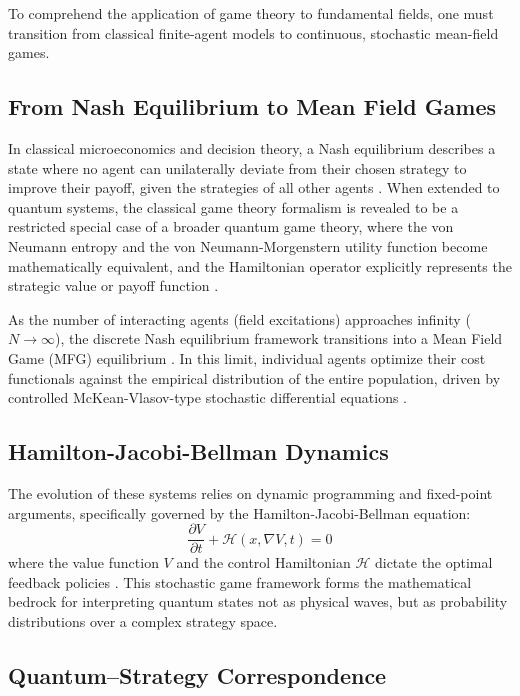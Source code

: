 \documentclass[12pt,a4paper]{article}
\theoremstyle{remark}
\begin{document}
To comprehend the application of game theory to fundamental fields, one must transition from classical finite-agent models to continuous, stochastic mean-field games.

\subsection{From Nash Equilibrium to Mean Field Games}

In classical microeconomics and decision theory, a Nash equilibrium describes a state where no agent can unilaterally deviate from their chosen strategy to improve their payoff, given the strategies of all other agents \citep{QuantumStrategies2024}. When extended to quantum systems, the classical game theory formalism is revealed to be a restricted special case of a broader quantum game theory, where the von Neumann entropy and the von Neumann-Morgenstern utility function become mathematically equivalent, and the Hamiltonian operator explicitly represents the strategic value or payoff function \citep{QuantumFoundations2023}.

As the number of interacting agents (field excitations) approaches infinity ($N \to \infty$), the discrete Nash equilibrium framework transitions into a Mean Field Game (MFG) equilibrium \citep{MFG2025}. In this limit, individual agents optimize their cost functionals against the empirical distribution of the entire population, driven by controlled McKean-Vlasov-type stochastic differential equations \citep{QuantumGameDecision2024}.

\subsection{Hamilton-Jacobi-Bellman Dynamics}

The evolution of these systems relies on dynamic programming and fixed-point arguments, specifically governed by the Hamilton-Jacobi-Bellman equation:
\begin{equation}
\frac{\partial V}{\partial t} + \mathcal{H}\left(x, \nabla V, t\right) = 0
\end{equation}
where the value function $V$ and the control Hamiltonian $\mathcal{H}$ dictate the optimal feedback policies \citep{QuantumGameDecision2024}. This stochastic game framework forms the mathematical bedrock for interpreting quantum states not as physical waves, but as probability distributions over a complex strategy space.

\subsection{Quantum--Strategy Correspondence}
\end{document}
